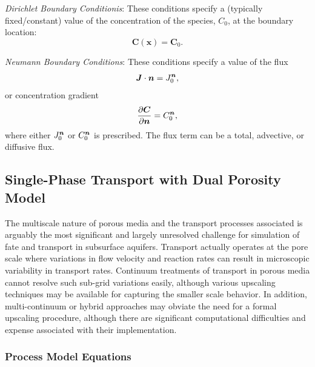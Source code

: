 \noindent \textit{Dirichlet Boundary Conditionis}:  
These conditions specify a (typically fixed/constant) value of the concentration of the species, $C_0$, 
at the boundary location:
\begin{equation}\label{eq:transport Dirichlet}
  \boldsymbol{C}(\boldsymbol{x})=\boldsymbol{C}_{0} .
\end{equation}

\textit{Neumann Boundary Conditions}:  
These conditions specify a value of the flux
\begin{equation}\label{eq:transport Neuman flux} 
  \boldsymbol{J}\cdot \boldsymbol{n} = J_0^{\boldsymbol{n}},
\end{equation}
or concentration gradient
\begin{equation}\label{eq:transport Neuman gradient}
  \frac{\partial \boldsymbol{C}}{\partial \boldsymbol{n}} = C_0^{\boldsymbol{n}},
\end{equation}
where either $J_0^{\boldsymbol{n}}$ or $C_0^{\boldsymbol{n}}$ is prescribed. 
The flux term can be a total, advective, or diffusive flux.




\subsection{Single-Phase Transport with Dual Porosity Model} 
\label{sec:transport-single-phase-dual-porosity}

The multiscale nature of porous media and the transport processes associated is 
arguably the most significant and largely unresolved challenge for simulation of 
fate and transport in subsurface aquifers.  
Transport actually operates at the pore scale where variations in flow velocity 
and reaction rates can result in microscopic variability in transport rates.  
Continuum treatments of transport in porous media cannot resolve such sub-grid 
variations easily, although various upscaling techniques may be available for 
capturing the smaller scale behavior.  
In addition, multi-continuum or hybrid approaches may obviate the need for a formal 
upscaling procedure, although there are significant computational difficulties and 
expense associated with their implementation.


\subsubsection{Process Model Equations} 

